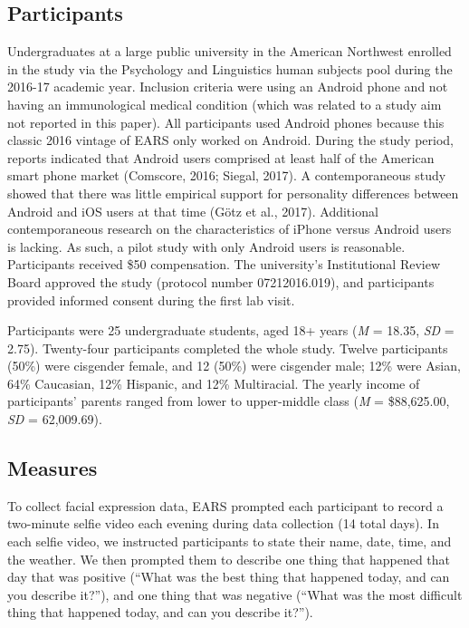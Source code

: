 \documentclass[authordate, empirical]{jote-new-article}
\begin{document}
\subsection{Participants}



Undergraduates at a large public university in the American Northwest enrolled in the study via the Psychology and Linguistics human subjects pool during the 2016-17 academic year. Inclusion criteria were using an Android phone and not having an immunological medical condition (which was related to a study aim not reported in this paper). All participants used Android phones because this classic 2016 vintage of EARS only worked on Android. During the study period, reports indicated that Android users comprised at least half of the American smart phone market (Comscore, 2016; Siegal, 2017). A contemporaneous study showed that there was little empirical support for personality differences between Android and iOS users at that time (Götz et al., 2017). Additional contemporaneous research on the characteristics of iPhone versus Android users is lacking. As such, a pilot study with only Android users is reasonable. Participants received \$50 compensation. The university's Institutional Review Board approved the study (protocol number 07212016.019), and participants provided informed consent during the first lab visit.



Participants were 25 undergraduate students, aged 18+ years (\emph{M} = 18.35, \emph{SD} = 2.75). Twenty-four participants completed the whole study. Twelve participants (50\%) were cisgender female, and 12 (50\%) were cisgender male; 12\% were Asian, 64\% Caucasian, 12\% Hispanic, and 12\% Multiracial. The yearly income of participants' parents ranged from lower to upper-middle class (\emph{M} = \$88,625.00, \emph{SD} = 62,009.69).







\subsection{Measures}



To collect facial expression data, EARS prompted each participant to record a two-minute selfie video each evening during data collection (14 total days). In each selfie video, we instructed participants to state their name, date, time, and the weather. We then prompted them to describe one thing that happened that day that was positive (“What was the best thing that happened today, and can you describe it?”), and one thing that was negative (“What was the most difficult thing that happened today, and can you describe it?”).
\end{document}
